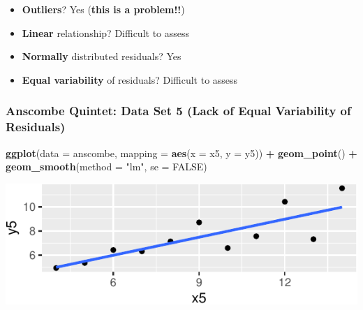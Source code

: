 \documentclass[14pt]{extarticle}
\newenvironment{Shaded}{\begin{snugshade}}{\end{snugshade}}
\newcommand{\KeywordTok}[1]{\textcolor[rgb]{0.13,0.29,0.53}{\textbf{#1}}}
\newcommand{\DataTypeTok}[1]{\textcolor[rgb]{0.13,0.29,0.53}{#1}}
\newcommand{\StringTok}[1]{\textcolor[rgb]{0.31,0.60,0.02}{#1}}
\newcommand{\OtherTok}[1]{\textcolor[rgb]{0.56,0.35,0.01}{#1}}
\newcommand{\OperatorTok}[1]{\textcolor[rgb]{0.81,0.36,0.00}{\textbf{#1}}}
\newcommand{\NormalTok}[1]{#1}
\begin{document}
\begin{itemize}
\item
  \textbf{Outliers}? Yes (\textbf{this is a problem!!})
\item
  \textbf{Linear} relationship? Difficult to assess
\item
  \textbf{Normally} distributed residuals? Yes
\item
  \textbf{Equal variability} of residuals? Difficult to assess
\end{itemize}

\newpage

\subsubsection{Anscombe Quintet: Data Set 5 (Lack of Equal Variability
of
Residuals)}\label{anscombe-quintet-data-set-5-lack-of-equal-variability-of-residuals}

\begin{Shaded}
\begin{Highlighting}[]
\KeywordTok{ggplot}\NormalTok{(}\DataTypeTok{data =}\NormalTok{ anscombe, }\DataTypeTok{mapping =} \KeywordTok{aes}\NormalTok{(}\DataTypeTok{x =}\NormalTok{ x5, }\DataTypeTok{y =}\NormalTok{ y5)) }\OperatorTok{+}
\StringTok{  }\KeywordTok{geom_point}\NormalTok{() }\OperatorTok{+}
\StringTok{  }\KeywordTok{geom_smooth}\NormalTok{(}\DataTypeTok{method =} \StringTok{"lm"}\NormalTok{, }\DataTypeTok{se =} \OtherTok{FALSE}\NormalTok{)}
\end{Highlighting}
\end{Shaded}

\includegraphics{20181112_anscombe_residuals_files/figure-latex/unnamed-chunk-15-1.pdf}

\begin{Shaded}
\end{Shaded}
\end{document}
